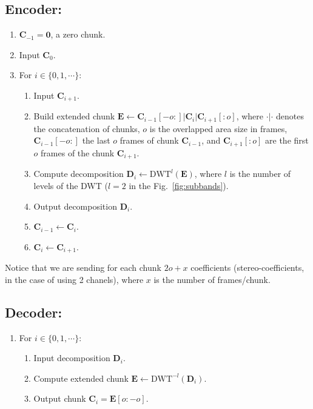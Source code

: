 \subsection*{Encoder:}
\begin{enumerate}
\item ${\mathbf C}_{-1}={\mathbf 0}$, a zero chunk.
\item Input ${\mathbf C}_0$.
\item For $i\in\{0,1,\cdots\}$:   
  \begin{enumerate}               
  \item Input ${\mathbf C}_{i+1}$.
  \item Build extended chunk ${\mathbf E}\leftarrow {\mathbf
    C}_{i-1}[-o:]|{\mathbf C}_i|{\mathbf C}_{i+1}[:o]$, where
    $\cdot|\cdot$ denotes the concatenation of chunks, $o$ is the
    overlapped area size in frames, ${\mathbf C}_{i-1}[-o:]$ the last
    $o$ frames of chunk ${\mathbf C}_{i-1}$, and ${\mathbf
      C}_{i+1}[:o]$ are the first $o$ frames of the chunk ${\mathbf
      C}_{i+1}$.
  \item Compute decomposition ${\mathbf D}_i \leftarrow
    \text{DWT}^l({\mathbf E})$, where $l$ is the number of levels of
    the DWT ($l=2$ in the Fig.~\ref{fig:subbands}).
  \item Output decomposition ${\mathbf D}_i$.
  \item ${\mathbf C}_{i-1}\leftarrow {\mathbf C}_i$.
  \item ${\mathbf C}_i\leftarrow {\mathbf C}_{i+1}$.
  \end{enumerate}
\end{enumerate}

Notice that we are sending for each chunk $2o+x$ coefficients
(stereo-coefficients, in the case of using 2 chanels), where $x$ is
the number of frames/chunk.

\subsection*{Decoder:}
\begin{enumerate}
\item For $i\in\{0,1,\cdots\}$:
  \begin{enumerate}
  \item Input decomposition ${\mathbf D}_i$.
  \item Compute extended chunk ${\mathbf E}\leftarrow\text{DWT}^{-l}({\mathbf D}_i)$.
  \item Output chunk ${\mathbf C}_i={\mathbf E}[o:-o]$.
  \end{enumerate}
\end{enumerate}

